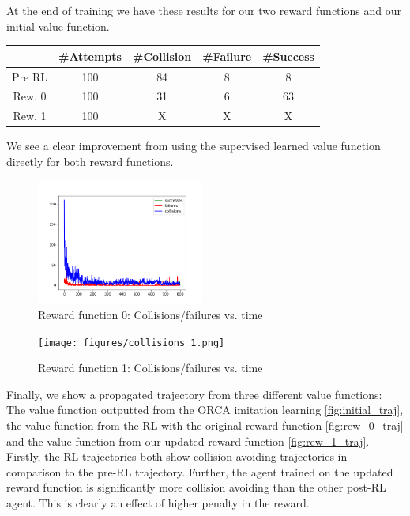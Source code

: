 \documentclass[conference]{IEEEtran}
\begin{document}
At the end of training we have these results for our two reward functions and our initial value function. 
\begin{center}
\begin{tabular}{||c c c c c||} 
 \hline
  & \#Attempts & \#Collision  & \#Failure  & \#Success \\ [0.5ex] 
 \hline\hline
 Pre RL & 100 & 84 & 8  & 8 \\ 
 \hline
 Rew. 0 & 100 & 31 & 6  & 63 \\
 Rew. 1 & 100 & X & X  & X \\
 \hline
\end{tabular}
\end{center}

We see a clear improvement from using the supervised learned value function directly for both reward functions. 
\begin{figure}
    \centering
    \includegraphics[width=0.49\textwidth]{docs/latex/figures/statistics_rew0.png}
    \caption{Reward function 0: Collisions/failures vs. time}
    \label{fig:rew_0_coll}
\end{figure}
\begin{figure}
    \centering
    \texttt{[image: figures/collisions\_1.png]}
    \caption{Reward function 1: Collisions/failures vs. time}
    \label{fig:rew_1_coll}
\end{figure}

Finally, we show a propagated trajectory from three different value functions: The value function outputted from the ORCA imitation learning \ref{fig:initial_traj}, the value function from the RL with the original reward function \ref{fig:rew_0_traj} and the value function from our updated reward function \ref{fig:rew_1_traj}. Firstly, the RL trajectories both show collision avoiding trajectories in comparison to the pre-RL trajectory. Further, the agent trained on the updated reward function is significantly more collision avoiding than the other post-RL agent. This is clearly an effect of higher penalty in the reward. 
\end{document}
